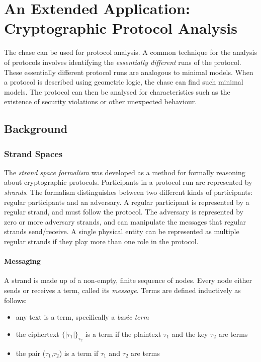 \section{An Extended Application: \\ Cryptographic Protocol Analysis}

	The chase can be used for protocol analysis. A common technique for the analysis
	of protocols involves identifying the \emph{essentially different} runs of
	the protocol. These essentially different protocol runs are analogous to
	minimal models. When a protocol is described using geometric logic, the
	chase can find such minimal models. The protocol can then be analysed for
	characteristics such as the existence of security violations or other
	unexpected behaviour.

	\subsection{Background}

		\subsubsection{Strand Spaces}

			The \emph{strand space formalism} was developed as a method for
			formally reasoning about cryptographic protocols. Participants in a
			protocol run are represented by \emph{strands}. The formalism
			distinguishes between two different kinds of participants: regular
			participants and an adversary. A regular participant is represented
			by a regular strand, and must follow the protocol. The adversary is
			represented by zero or more adversary strands, and can manipulate
			the messages that regular strands send/receive. A single physical
			entity can be represented as multiple regular strands if they play
			more than one role in the protocol.

			\paragraph{Messaging}

				A strand is made up of a non-empty, finite sequence of nodes.
				Every node either sends or receives a term, called its
				\emph{message}.  Terms are defined inductively as follows:

				\begin{itemize}
				\item any text is a term, specifically a \emph{basic term}
				\item the ciphertext $\{|\tau_1|\}_{\tau_2}$ is a term if the plaintext $\tau_1$ and the key $\tau_2$ are terms
				\item the pair ($\tau_1$,$\tau_2$) is a term if $\tau_1$ and $\tau_2$ are terms
				\end{itemize}

